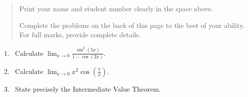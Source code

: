 \documentclass[12pt]{article}
\newcommand{\points}[1]{\marginpar{\hspace{24pt}[#1]}}
\newcommand{\di}{\displaystyle}
\begin{document}
\begin{quote}
Print your name and student number clearly in the space above. 

\medskip

Complete the problems on the back of this page to the best of your ability.
For full marks, provide complete details.

\medskip

\end{quote}
\newpage
\thispagestyle{empty}
\begin{enumerate}
 \item \,  Calculate  $\di \lim_{x \to 0 } \frac{\sin^2(5x)}{1-\cos(2x)}$.  \points{4}
% 
% 
%
%

 \vspace{8cm}
 
 \item     \,  Calculate  $\di \lim_{x \to 0 } x^2 \cos(\frac{7}{x})$.  \points{4}
 
 
 \vspace{9cm}
 
 \item \, State precisely the Intermediate Value Theorem.  \points{2}
% 
% 
\end{enumerate}
\end{document}
